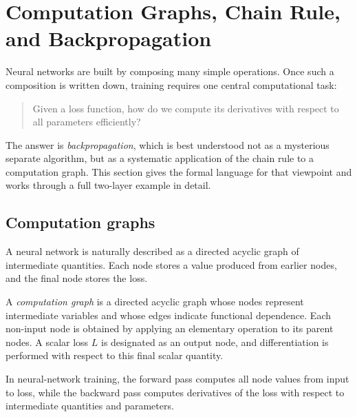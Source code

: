 \section{Computation Graphs, Chain Rule, and Backpropagation}

Neural networks are built by composing many simple operations. Once such a composition is written down, training requires one central computational task:

\begin{quote}
Given a loss function, how do we compute its derivatives with respect to all parameters efficiently?
\end{quote}

The answer is \emph{backpropagation}, which is best understood not as a mysterious separate algorithm, but as a systematic application of the chain rule to a computation graph. This section gives the formal language for that viewpoint and works through a full two-layer example in detail.

\subsection*{Computation graphs}

A neural network is naturally described as a directed acyclic graph of intermediate quantities. Each node stores a value produced from earlier nodes, and the final node stores the loss.

\begin{definition}
A \emph{computation graph} is a directed acyclic graph whose nodes represent intermediate variables and whose edges indicate functional dependence. Each non-input node is obtained by applying an elementary operation to its parent nodes. A scalar loss $L$ is designated as an output node, and differentiation is performed with respect to this final scalar quantity.
\end{definition}

In neural-network training, the forward pass computes all node values from input to loss, while the backward pass computes derivatives of the loss with respect to intermediate quantities and parameters.

